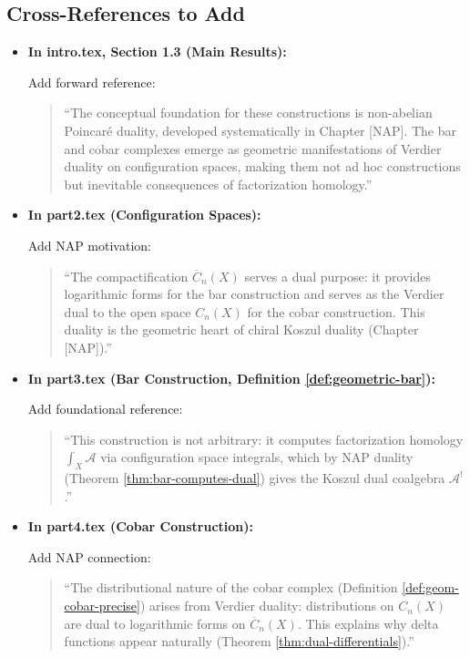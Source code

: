 \subsection{Cross-References to Add}

\begin{itemize}
\item \textbf{In intro.tex, Section 1.3 (Main Results):}
  
  Add forward reference:
  \begin{quote}
  ``The conceptual foundation for these constructions is non-abelian Poincaré duality, developed systematically in Chapter [NAP]. The bar and cobar complexes emerge as geometric manifestations of Verdier duality on configuration spaces, making them not ad hoc constructions but inevitable consequences of factorization homology.''
  \end{quote}

\item \textbf{In part2.tex (Configuration Spaces):}
  
  Add NAP motivation:
  \begin{quote}
  ``The compactification $\overline{C}_n(X)$ serves a dual purpose: it provides logarithmic forms for the bar construction and serves as the Verdier dual to the open space $C_n(X)$ for the cobar construction. This duality is the geometric heart of chiral Koszul duality (Chapter [NAP]).''
  \end{quote}

\item \textbf{In part3.tex (Bar Construction, Definition \ref{def:geometric-bar}):}
  
  Add foundational reference:
  \begin{quote}
  ``This construction is not arbitrary: it computes factorization homology $\int_X \mathcal{A}$ via configuration space integrals, which by NAP duality (Theorem \ref{thm:bar-computes-dual}) gives the Koszul dual coalgebra $\mathcal{A}^!$.''
  \end{quote}

\item \textbf{In part4.tex (Cobar Construction):}
  
  Add NAP connection:
  \begin{quote}
  ``The distributional nature of the cobar complex (Definition \ref{def:geom-cobar-precise}) arises from Verdier duality: distributions on $C_n(X)$ are dual to logarithmic forms on $\overline{C}_n(X)$. This explains why delta functions appear naturally (Theorem \ref{thm:dual-differentials}).''
  \end{quote}
\end{itemize}

